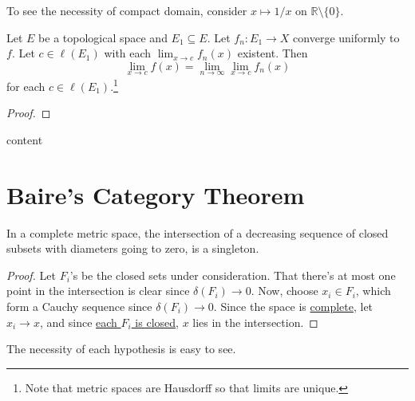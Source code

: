 	\begin{rmk}
		To see the necessity of compact domain, consider $x\mapsto 1/x$ on $\mathbb R\setminus\{0\}$.
	\end{rmk}
	
	
	\begin{prp}
		Let $E$ be a topological space and $E_1\subseteq E$. Let $f_n\colon E_1\to X$ converge uniformly to $f$. Let $c\in\ell(E_1)$ with each $\lim_{x\to c} f_n(x)$ existent. Then
		\[
		\lim_{x\to c} f(x) = \lim_{n\to\infty}\lim_{x\to c}f_n(x)
		\]
		for each $c\in\ell(E_1)$.\footnote{Note that metric spaces are Hausdorff so that limits are unique.}
	\end{prp}
	
	\begin{proof}
		
	\end{proof}
	
	\begin{rmk}
		content
	\end{rmk}
	
	
	


\section{Baire's Category Theorem}

	\begin{prp}
		In a complete metric space, the intersection of a decreasing sequence of closed subsets with diameters going to zero, is a singleton.
	\end{prp}
	
	\begin{proof}
		Let $F_i$'s be the closed sets under consideration. That there's at most one point in the intersection is clear since \ul{$\delta(F_i)\to 0$}. Now, choose
		$x_i\in F_i$, which form a Cauchy sequence since \ul{$\delta(F_i)\to 0$}. Since the space is \ul{complete}, let $x_i\to x$, and since \ul{each $F_i$ is closed}, $x$ lies in the intersection.
	\end{proof}
	
	\begin{rmk}
		The necessity of each hypothesis is easy to see.
	\end{rmk}
	
